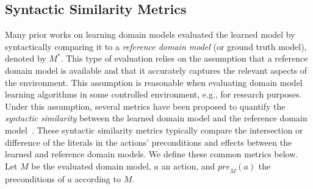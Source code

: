 \documentclass[letterpaper]{article} %
\newcommand{\pre}{\ensuremath{\textit{pre}}\xspace}
\newcommand{\realm}{{\ensuremath{M^*}}\xspace}
\newif\ifaddcomments
\newcommand{\roni}[1]{\ifaddcomments{\textcolor{red}{[Roni: #1]}}\fi}
\newcommand{\cm}[1]{\ifaddcomments{\textcolor{olive}{[Christian: #1]}}\fi}
\begin{document}
\subsection{Syntactic Similarity Metrics}
Many prior works on learning domain models evaluated the learned model by syntactically comparing it to a \emph{reference domain model} (or ground truth model), denoted by $\realm$. This type of evaluation relies on the assumption that a reference domain model 
is available and that it accurately captures the relevant aspects of the environment. 
This assumption is reasonable when evaluating domain model learning algorithms in some controlled environment, e.g., for research purposes. 
Under this assumption, several metrics have been proposed to quantify the \emph{syntactic similarity} between the learned domain model and the reference domain model~\citep{garrido2024challenges,mordoch2023safe,xi2024neuro,Oswald2024DLLMDomainModeling}.
These syntactic similarity metrics typically compare the intersection or difference of the literals in the actions' preconditions and effects between the learned and reference domain models. 
We define these common metrics below. 
Let $M$ be the evaluated domain model, $a$ an action, and $\pre_M(a)$ the preconditions of $a$ according to $M$.

\end{document}
